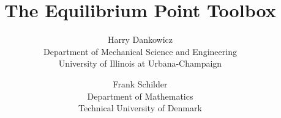 \documentclass[final,12pt]{article}
\begin{document}
\lstset{language=coco}

\title{The Equilibrium Point Toolbox}

\author{Harry Dankowicz \\ Department of Mechanical Science and Engineering \\
University of Illinois at Urbana-Champaign \and
Frank Schilder \\ Department of Mathematics \\
Technical University of Denmark}

\maketitle

\tableofcontents
\newpage

\end{document}
